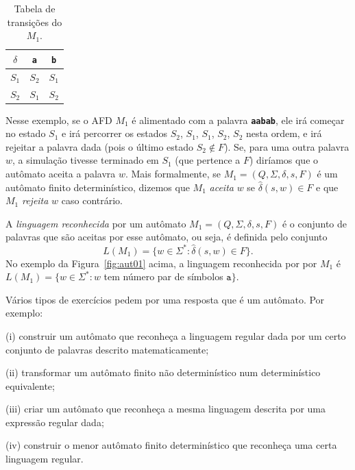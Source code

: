 \documentclass[
	12pt,				%
	openany,
	oneside,
	a4paper,			%
	english,			%
	brazil,				%
	]{abntex2}
\begin{document}
\begin{table}[H]
	\centering
	\begin{tabular}[H]{c|c c}
		$\delta$ & \textbf{\texttt{a}} & \textbf{\texttt{b}} \\
		\hline
		$S_1$    & $S_2$               & $S_1$               \\
		$S_2$    & $S_1$               & $S_2$
	\end{tabular}
	\caption{Tabela de transições do $M_1$.}
	\label{tab:tabTransicoesM1}
	\vspace{-0.5cm}
\end{table}


Nesse exemplo, se o AFD $M_1$ é alimentado com a palavra \textbf{\texttt{aabab}}, ele irá começar no estado $S_1$ e irá percorrer os estados $S_2$, $S_1$, $S_1$, $S_2$, $S_2$ nesta ordem, e irá rejeitar a palavra dada (pois o último estado $S_2 \not\in F$). Se, para uma outra palavra $w$, a simulação tivesse terminado em $S_1$ (que pertence a $F$) diríamos que o autômato aceita a palavra $w$. Mais formalmente, se $M_1 = (Q, \Sigma, \delta, s, F)$ é um autômato finito determinístico, dizemos que $M_1$ \emph{aceita} $w$ se $\hat{\delta}(s, w) \in F$ e que $M_1$ \emph{rejeita} $w$ caso contrário.

A \emph{linguagem reconhecida} por um autômato $M_1 = (Q, \Sigma, \delta, s, F)$ é o conjunto de palavras que são aceitas por esse autômato, ou seja, é definida pelo conjunto \[ L(M_1) = \{w \in \Sigma^* \colon \hat{\delta}(s, w) \in F \}.  \] No exemplo da Figura~\ref{fig:aut01} acima, a linguagem reconhecida por por $M_1$ é $L(M_1) = \{w \in \Sigma^* :  w$  tem número par de símbolos $\mathtt{a}\}$.

\bigskip

Vários tipos de exercícios pedem por uma resposta que é um autômato. Por exemplo:
\begin{alineas}%
	\item[(i)] construir um autômato que reconheça a linguagem regular
	dada por um certo conjunto de palavras descrito matematicamente;
	\item[(ii)] transformar um autômato finito não determinístico num
	determinístico equivalente;
	\item[(iii)] criar um autômato que reconheça a mesma linguagem
	descrita por uma expressão regular dada;
	\item[(iv)] construir o menor autômato finito determinístico
	que reconheça uma certa linguagem regular.
\end{alineas}
\end{document}
